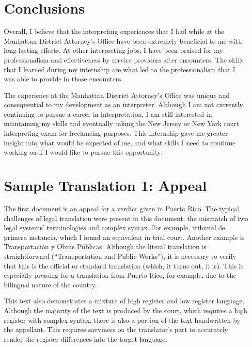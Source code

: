 \documentclass{article}
\begin{document}
\section{Conclusions}

Overall, I believe that the interpreting experiences that I had while at the Manhattan District Attorney’s Office have been extremely beneficial to me with long-lasting effects. At other interpreting jobs, I have been praised for my professionalism and effectiveness by service providers after encounters. The skills that I learned during my internship are what led to the professionalism that I was able to provide in those encounters.

The experience at the Manhattan District Attorney’s Office was unique and consequential to my development as an interpreter. Although I am not currently continuing to pursue a career in interpretation, I am still interested in maintaining my skills and eventually taking the New Jersey or New York court interpreting exam for freelancing purposes. This internship gave me greater insight into what would be expected of me, and what skills I need to continue working on if I would like to pursue this opportunity.

\appendix

\section{Sample Translation 1: Appeal}

The first document is an appeal for a verdict given in Puerto Rico. The typical challenges of legal translation were present in this document: the mismatch of two legal systems’ terminologies and complex syntax. For example, tribunal de primera instancia, which I found an equivalent in trial court. Another example is Transportación y Obras Públicas. Although the literal translation is straightforward (“Transportation and Public Works”), it is necessary to verify that this is the official or standard translation (which, it turns out, it is). This is especially pressing for a translation from Puerto Rico, for example, due to the bilingual nature of the country.

This text also demonstrates a mixture of high register and low register language. Although the majority of the text is produced by the court, which requires a high register with complex syntax, there is also a portion of the text handwritten by the appellant. This requires savviness on the translator’s part to accurately render the register differences into the target language. 
\end{document}
